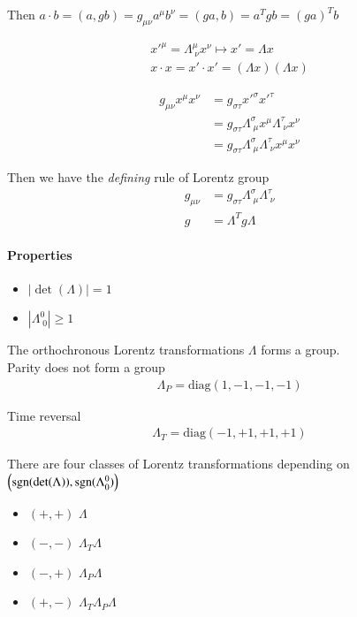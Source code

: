Then $a\cdot b = (a, gb) = g_{\mu\nu} a^\mu b^\nu = (ga, b) = a^Tgb = (ga)^T b$

\begin{align}
   x'^\mu = \Lambda^\mu_{\;\nu} x^\nu \mapsto x' = \Lambda x \\
   x \cdot x = x' \cdot x' = (\Lambda x) (\Lambda x)
\end{align}

\begin{align*}
   g_{\mu\nu} x^\mu x^\nu &= g_{\sigma \tau} x'^\sigma x'^\tau \\
                          &= g_{\sigma \tau} \Lambda^\sigma_{\; \mu} x^\mu \Lambda^\tau_{\;\nu} x^\nu \\
                          &= g_{\sigma \tau} \Lambda^\sigma_{\; \mu} \Lambda^\tau_{\;\nu}x^\mu  x^\nu 
\end{align*}

Then we have the \textit{defining} rule of Lorentz group
\begin{align}
   g_{\mu\nu} &= g_{\sigma \tau}  \Lambda^\sigma_{\; \mu} \Lambda^\tau_{\;\nu} \\
   g &= \Lambda^T g \Lambda
\end{align}

\paragraph{Properties}
\begin{itemize}
   \item $\left|\det(\Lambda) \right| = 1$
   \item $\left|\Lambda^0_{\;0} \right| \geq 1$
\end{itemize}

The orthochronous Lorentz transformations $\Lambda$ forms a group. \\

Parity does not form a group
      \begin{align}
         \Lambda_P = \text{diag}(1,-1,-1,-1)
      \end{align}

Time reversal 
\begin{align}
   \Lambda_T = \text{diag}(-1,+1,+1,+1)
\end{align}

There are four classes of Lorentz transformations depending on $\left(\text{sgn}(\det(\Lambda)), \text{sgn}(\Lambda^0_0) \right)$
\begin{itemize}
   \item $(+, +)$ $\Lambda$
   \item $(- ,-)$ $\Lambda_T \Lambda$ 
   \item $(-, +)$ $\Lambda_P \Lambda$
   \item $(+, -)$ $\Lambda_T\Lambda_P \Lambda$
\end{itemize}

